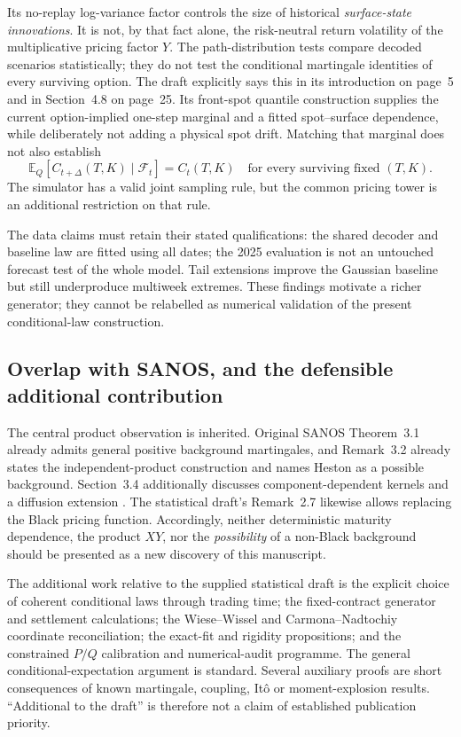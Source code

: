 \documentclass[11pt,a4paper]{article}
\numberwithin{equation}{section}
\theoremstyle{definition}\newtheorem{definition}[theorem]{Definition}
\theoremstyle{remark}\newtheorem{remark}[theorem]{Remark}
\newcommand{\E}{\mathbb E}\newcommand{\R}{\mathbb R}
\newcommand{\F}{\mathcal F}\newcommand{\G}{\mathcal G}
\begin{document}
Its no-replay log-variance factor controls the size of historical \emph{surface-state innovations}. It is not, by that fact alone, the risk-neutral return volatility of the multiplicative pricing factor $Y$. The path-distribution tests compare decoded scenarios statistically; they do not test the conditional martingale identities of every surviving option. The draft explicitly says this in its introduction on page~5 and in Section~4.8 on page~25. Its front-spot quantile construction supplies the current option-implied one-step marginal and a fitted spot--surface dependence, while deliberately not adding a physical spot drift. Matching that marginal does not also establish
\begin{equation}
 \E_Q[C_{t+\Delta}(T,K)\mid\F_t]=C_t(T,K)
 \quad\text{for every surviving fixed }(T,K).
 \label{eq:dy2-missing-tower}
\end{equation}
The simulator has a valid joint sampling rule, but the common pricing tower is an additional restriction on that rule.

The data claims must retain their stated qualifications: the shared decoder and baseline law are fitted using all dates; the 2025 evaluation is not an untouched forecast test of the whole model. Tail extensions improve the Gaussian baseline but still underproduce multiweek extremes. These findings motivate a richer generator; they cannot be relabelled as numerical validation of the present conditional-law construction.

\subsection{Overlap with SANOS, and the defensible additional contribution}
The central product observation is inherited. Original SANOS Theorem~3.1 already admits general positive background martingales, and Remark~3.2 already states the independent-product construction and names Heston as a possible background. Section~3.4 additionally discusses component-dependent kernels and a diffusion extension \cite{SANOS}. The statistical draft's Remark~2.7 likewise allows replacing the Black pricing function. Accordingly, neither deterministic maturity dependence, the product $XY$, nor the \emph{possibility} of a non-Black background should be presented as a new discovery of this manuscript.

The additional work relative to the supplied statistical draft is the explicit choice of coherent conditional laws through trading time; the fixed-contract generator and settlement calculations; the Wiese--Wissel and Carmona--Nadtochiy coordinate reconciliation; the exact-fit and rigidity propositions; and the constrained $P/Q$ calibration and numerical-audit programme. The general conditional-expectation argument is standard. Several auxiliary proofs are short consequences of known martingale, coupling, It\^o or moment-explosion results. ``Additional to the draft'' is therefore not a claim of established publication priority.
\end{document}
